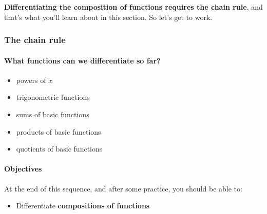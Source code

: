 \documentclass[pdftex, brazil, 12pt, twoside]{article}
\begin{document}
\begin{figure}[H]
  \begin{center}
  \end{center}
\end{figure}

\textbf{Differentiating the composition of functions
requires the chain rule}, and that's
what you'll learn about in this section.
So let's get to work.

\subsubsection{The chain rule}
\label{u2-chain-rule-objs}

\paragraph{What functions can we differentiate so far?}
\begin{itemize}[noitemsep]
\item powers of $x$
\item trigonometric functions
\item sums of basic functions
\item products of basic functions
\item quotients of basic functions
\end{itemize}

\paragraph{Objectives} At the end of this sequence, and after some practice, you
should be able to:
\begin{itemize}[noitemsep]
\item Differentiate \textbf{compositions of functions}
\end{itemize}
\end{document}
